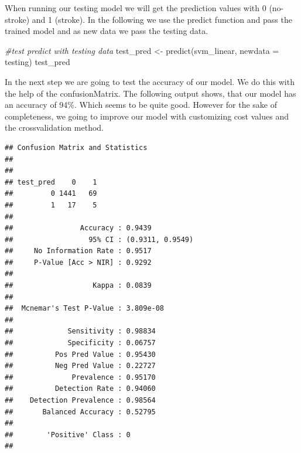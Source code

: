 \documentclass[
]{article}
\newenvironment{Shaded}{\begin{snugshade}}{\end{snugshade}}
\newcommand{\AttributeTok}[1]{\textcolor[rgb]{0.77,0.63,0.00}{#1}}
\newcommand{\CommentTok}[1]{\textcolor[rgb]{0.56,0.35,0.01}{\textit{#1}}}
\newcommand{\FunctionTok}[1]{\textcolor[rgb]{0.00,0.00,0.00}{#1}}
\newcommand{\NormalTok}[1]{#1}
\newcommand{\OtherTok}[1]{\textcolor[rgb]{0.56,0.35,0.01}{#1}}
\newcommand{\SpecialCharTok}[1]{\textcolor[rgb]{0.00,0.00,0.00}{#1}}
\renewcommand{\=}[1]{\stackrel{#1}{=}}
\theoremstyle{definition}
\theoremstyle{remark}
\begin{document}
When running our testing model we will get the prediction values with 0 (no-stroke) and 1 (stroke). In the following we use the predict function and pass the trained model and as new data we pass the testing data.

\begin{Shaded}
\begin{Highlighting}[]
\CommentTok{\#test predict with testing data}
\NormalTok{test\_pred }\OtherTok{\textless{}{-}} \FunctionTok{predict}\NormalTok{(svm\_linear, }\AttributeTok{newdata =}\NormalTok{ testing)}
\NormalTok{test\_pred}
\end{Highlighting}
\end{Shaded}

In the next step we are going to test the accuracy of our model. We do this with the help of the confusionMatrix. The following output shows, that our model has an accuracy of 94\%. Which seems to be quite good. However for the sake of completeness, we going to improve our model with customizing cost values and the crossvalidation method.

\begin{Shaded}
\end{Shaded}

\begin{verbatim}
## Confusion Matrix and Statistics
## 
##          
## test_pred    0    1
##         0 1441   69
##         1   17    5
##                                           
##                Accuracy : 0.9439          
##                  95% CI : (0.9311, 0.9549)
##     No Information Rate : 0.9517          
##     P-Value [Acc > NIR] : 0.9292          
##                                           
##                   Kappa : 0.0839          
##                                           
##  Mcnemar's Test P-Value : 3.809e-08       
##                                           
##             Sensitivity : 0.98834         
##             Specificity : 0.06757         
##          Pos Pred Value : 0.95430         
##          Neg Pred Value : 0.22727         
##              Prevalence : 0.95170         
##          Detection Rate : 0.94060         
##    Detection Prevalence : 0.98564         
##       Balanced Accuracy : 0.52795         
##                                           
##        'Positive' Class : 0               
## 
\end{verbatim}
\end{document}
